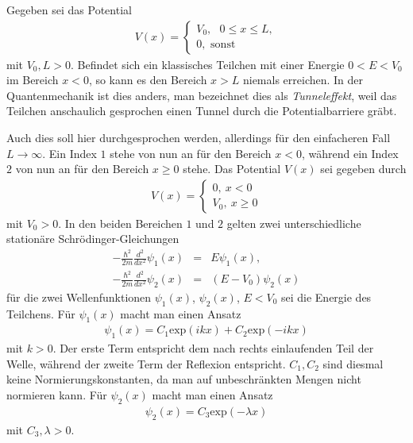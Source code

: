 \documentclass{book}
\renewcommand{\exp}{\text{exp}}
\begin{document}
Gegeben sei das Potential
%
\begin{eqnarray}
V\left(x\right) = \begin{cases}
V_0, \text{ }0\leq x\leq L,\\
0, \text{ sonst}
\end{cases}
\end{eqnarray}
%
mit $V_0, L>0$. Befindet sich ein klassisches Teilchen mit einer Energie $0<E<V_0$ im Bereich $x<0$, so kann es den Bereich $x>L$ niemals erreichen. In der Quantenmechanik ist dies anders, man bezeichnet dies als \textit{Tunneleffekt}, weil das Teilchen anschaulich gesprochen einen Tunnel durch die Potentialbarriere gräbt.

Auch dies soll hier durchgesprochen werden, allerdings für den einfacheren Fall $L\to\infty$. Ein Index $1$ stehe von nun an für den Bereich $x<0$, während ein Index $2$ von nun an für den Bereich $x\geq0$ stehe. Das Potential $V\left(x\right)$ sei gegeben durch
%
\begin{eqnarray}
V\left(x\right) = \begin{cases}
0, \:x<0\\
V_0, \:x\geq 0
\end{cases}
\end{eqnarray}
%
mit $V_0>0$. In den beiden Bereichen $1$ und $2$ gelten zwei unterschiedliche stationäre Schrödinger-Gleichungen
%
\begin{eqnarray}
- \frac{\hbar^2}{2m}\frac{d^2}{dx^2}\psi_1\left(x\right) & = & E\psi_1\left(x\right),\\
- \frac{\hbar^2}{2m}\frac{d^2}{dx^2}\psi_2\left(x\right) & = & \left(E - V_0\right)\psi_2\left(x\right)
\end{eqnarray}
%
für die zwei Wellenfunktionen $\psi_1\left(x\right)$, $\psi_2\left(x\right)$, $E<V_0$ sei die Energie des Teilchens. Für $\psi_1\left(x\right)$ macht man einen Ansatz
%
\begin{eqnarray}
\psi_1\left(x\right) = C_1\exp\left(ikx\right) + C_2\exp\left(-ikx\right)
\end{eqnarray}
%
mit $k > 0$. Der erste Term entspricht dem nach rechts einlaufenden Teil der Welle, während der zweite Term der Reflexion entspricht. $C_1, C_2$ sind diesmal keine Normierungskonstanten, da man auf unbeschränkten Mengen nicht normieren kann. Für $\psi_2\left(x\right)$ macht man einen Ansatz
%
\begin{eqnarray}
\psi_2\left(x\right) = C_3\exp\left(-\lambda x\right)
\end{eqnarray}
%
mit $C_3, \lambda > 0$.
\end{document}
